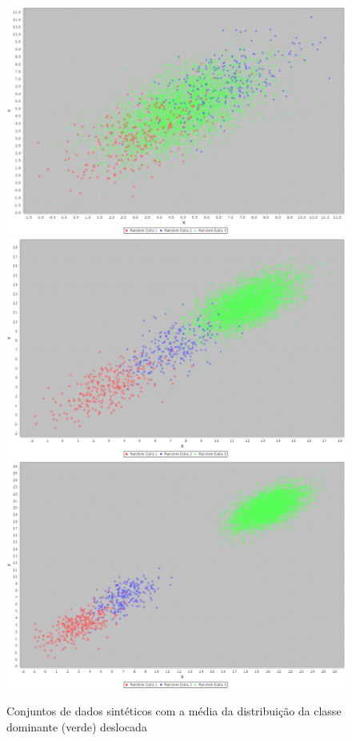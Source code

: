 \begin{figure}
  \centering
  \includegraphics[width=120mm,scale=0.7]{images/dist250-4000-5.eps}
  \includegraphics[width=120mm,scale=0.7]{images/dist250-4000-12.eps}
  \includegraphics[width=120mm,scale=0.7]{images/dist250-4000-20.eps}
  \caption{Conjuntos de dados sintéticos com a média da distribuição da classe dominante (verde) deslocada}
  \label{fig:dist_iguais}
\end{figure}

